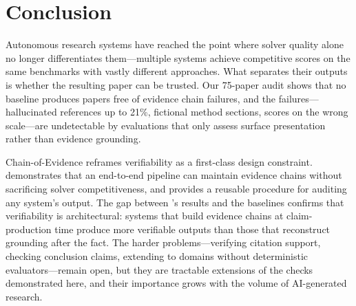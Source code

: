 \section{Conclusion}
\label{sec:conclusion}

Autonomous research systems have reached the point where solver quality alone no longer differentiates them---multiple systems achieve competitive scores on the same benchmarks with vastly different approaches.
What separates their outputs is whether the resulting paper can be trusted.
Our 75-paper audit shows that no baseline produces papers free of evidence chain failures, and the failures---hallucinated references up to 21\%, fictional method sections, scores on the wrong scale---are undetectable by evaluations that only assess surface presentation rather than evidence grounding.

Chain-of-Evidence reframes verifiability as a first-class design constraint.
\sys{} demonstrates that an end-to-end pipeline can maintain evidence chains without sacrificing solver competitiveness, and \coeaudit{} provides a reusable procedure for auditing any system's output.
The gap between \sys{}'s results and the baselines confirms that verifiability is architectural: systems that build evidence chains at claim-production time produce more verifiable outputs than those that reconstruct grounding after the fact.
The harder problems---verifying citation support, checking conclusion claims, extending to domains without deterministic evaluators---remain open, but they are tractable extensions of the checks demonstrated here, and their importance grows with the volume of AI-generated research.
